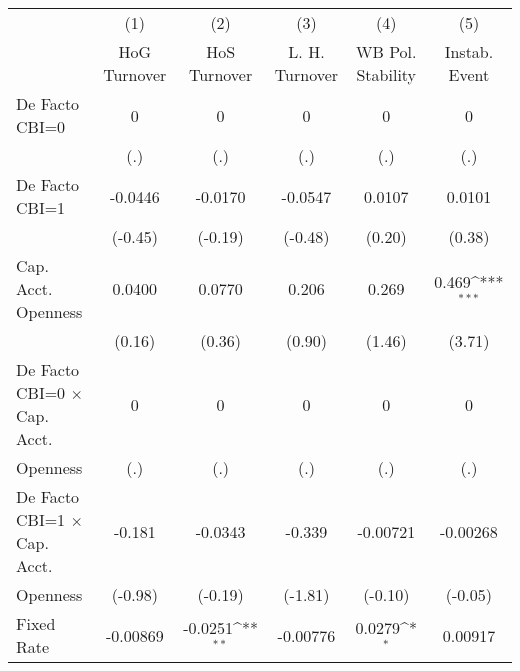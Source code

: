 \begin{table}[htbp]\centering
\def\sym#1{\ifmmode^{#1}\else\(^{#1}\)\fi}
\caption{\label{ikmultIndFEDF}}
\begin{tabular}{l*{5}{c}}
\toprule
                                        &\multicolumn{1}{c}{(1)}&\multicolumn{1}{c}{(2)}&\multicolumn{1}{c}{(3)}&\multicolumn{1}{c}{(4)}&\multicolumn{1}{c}{(5)}\\
                                        &\multicolumn{1}{c}{HoG Turnover}&\multicolumn{1}{c}{HoS Turnover}&\multicolumn{1}{c}{L. H. Turnover}&\multicolumn{1}{c}{WB Pol. Stability}&\multicolumn{1}{c}{Instab. Event}\\
\midrule
De Facto CBI=0                          &        0         &        0         &        0         &        0         &        0         \\
                                        &      (.)         &      (.)         &      (.)         &      (.)         &      (.)         \\
\addlinespace
De Facto CBI=1                          &  -0.0446         &  -0.0170         &  -0.0547         &   0.0107         &   0.0101         \\
                                        &  (-0.45)         &  (-0.19)         &  (-0.48)         &   (0.20)         &   (0.38)         \\
\addlinespace
Cap. Acct. Openness                     &   0.0400         &   0.0770         &    0.206         &    0.269         &    0.469\sym{***}\\
                                        &   (0.16)         &   (0.36)         &   (0.90)         &   (1.46)         &   (3.71)         \\
\addlinespace
De Facto CBI=0 $\times$ Cap. Acct.      &        0         &        0         &        0         &        0         &        0         \\
Openness                                &      (.)         &      (.)         &      (.)         &      (.)         &      (.)         \\
\addlinespace
De Facto CBI=1 $\times$ Cap. Acct.      &   -0.181         &  -0.0343         &   -0.339         & -0.00721         & -0.00268         \\
Openness                                &  (-0.98)         &  (-0.19)         &  (-1.81)         &  (-0.10)         &  (-0.05)         \\
\addlinespace
Fixed Rate                              & -0.00869         &  -0.0251\sym{**} & -0.00776         &   0.0279\sym{*}  &  0.00917         \\

\end{tabular}
\end{table}
